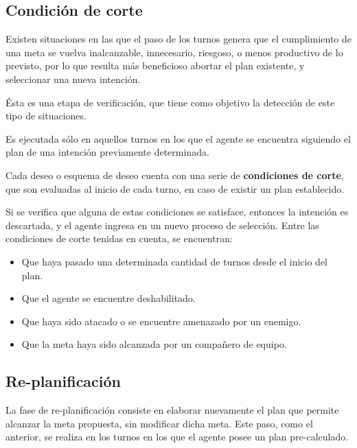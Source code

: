 \subsection{Condición de corte}
\label{sec:condicion_de_corte}



Existen situaciones en las que el paso de los turnos genera que el
cumplimiento de una meta se vuelva inalcanzable, innecesario,
riesgoso, o menos productivo de lo previsto, por lo que resulta más
beneficioso abortar el plan existente, y seleccionar una nueva
intención. 

 Ésta es una etapa de verificación, que tiene como objetivo
la detección de este tipo de situaciones. 

Es ejecutada sólo en
aquellos turnos en los que el agente se encuentra siguiendo el plan
de una intención previamente determinada.



Cada deseo o esquema de deseo cuenta con una serie de
\textbf{condiciones de corte}, que son evaluadas al inicio de cada
turno, en caso de existir un plan establecido. 

Si se verifica que
alguna de estas condiciones se satisface, entonces la intención es
descartada, y el agente ingresa en un nuevo proceso de selección.
Entre las condiciones de corte tenidas en cuenta, se encuentran:



\begin{itemize}
\item Que haya pasado una determinada cantidad de turnos desde el
inicio del plan.

\item Que el agente se encuentre deshabilitado.

\item Que haya sido atacado o se encuentre amenazado por un enemigo.

\item Que la meta haya sido alcanzada por un compañero de equipo.
\end{itemize}

\subsection{Re-planificación}
\label{sec:replanificacion}



La fase de re-planificación consiste en elaborar nuevamente el plan
que permite alcanzar la meta propuesta, sin modificar dicha meta.
Este paso, como el anterior, se realiza en los turnos en los que el
agente posee un plan pre-calculado. 

